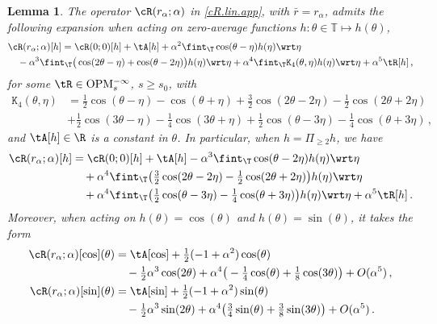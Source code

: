 \documentclass[a4paper,reqno,10pt]{article}
\newtheorem{lem}{Lemma}[section]
\newcommand{\OpM}{{\rm O}{\rm P}{\rm M}}
\begin{document}
\begin{lem}\label{lemma.R.expand}
The operator $\cR(r_\alpha;\alpha)$ in \eqref{cR.lin.app}, with $\bar r = r_\alpha$, admits the following expansion when acting on zero-average functions $h:\theta\in\mathbb{T}\mapsto h(\theta)$, 	
    \begin{align}
			&\cR(r_\alpha;\alpha) [h]  = \cR(0;0)[h] +	\tA[h]+ {\alpha^2}\fint_{\T}\cos(\theta-\eta) h(\eta) \wrt \eta \\
			&\quad  - {\alpha^3} \fint_{\T}\big( \cos(2\theta-\eta) + \cos(\theta-2\eta) \big)h(\eta) \wrt \eta +{\alpha^4}\fint_{\T} \mathtt{K}_4(\theta,\eta)h(\eta) \wrt\eta  +\alpha^5 \tR[h]\,,
			\label{exp.R.total}
	\end{align}
  for some $\tR \in \OpM_{s}^{-\infty}$, $s\geq s_0$,  with
    \begin{align}
        \mathtt{K}_4(\theta,\eta)&= \tfrac12 \cos(\theta-\eta) - \cos(\theta+\eta)+\tfrac32\cos(2\theta-2\eta)  -\tfrac12\cos(2\theta+2\eta)\\
        &+\tfrac12\cos(3\theta-\eta) -\tfrac14\cos(3\theta+\eta)  +\tfrac12 \cos(\theta-3\eta)-\tfrac14\cos(\theta+3\eta) \,, \label{K4.kernel}
    \end{align}
and    $\tA[h]\in \R$ is a constant in $\theta$. 
	In particular, when $h= \Pi_{\geq 2}h$, we have
			\begin{align}
			\cR(r_\alpha;\alpha) [h] & = \cR(0;0)  [h] +	\tA[ h]  - {\alpha^3} \fint_{\T} \cos(\theta-2\eta)h(\eta) \wrt \eta    \\
			&\quad +{\alpha^4}\fint_{\T}\big(\tfrac32\cos(2\theta-2\eta)  -\tfrac12\cos(2\theta+2\eta)\big)  h(\eta) \wrt\eta \\
			&  \quad +{\alpha^4} \fint_{\T} \big(\tfrac12 \cos(\theta-3\eta)-\tfrac14\cos(\theta+3\eta) \big)  h(\eta) \wrt\eta +\alpha^5 \tR[h] \,.
			\label{exp.R.geq2}
			\end{align}
	Moreover, when acting on $h(\theta)=\cos(\theta)$ and $h(\theta)=\sin(\theta)$, it takes the form
		\begin{align}
			\cR(r_\alpha;\alpha) [\cos](\theta) & = \tA[\cos] + {\tfrac12(-1+\alpha^2)\cos(\theta)} \\
			&\quad - \tfrac12\alpha^3 \cos(2\theta)+ \alpha^4\big( -\tfrac14 \cos(\theta) +\tfrac18 \cos(3\theta) \big) + O(\alpha^5) \,, \label{exp.R.modecos}  \\
				\cR(r_\alpha;\alpha) [\sin](\theta) & = \tA[\sin] +{ \tfrac12(-1+\alpha^2)\sin(\theta)} \\
				& \quad - \tfrac12\alpha^3\sin(2\theta)+\alpha^4\big( \tfrac34\sin(\theta) +\tfrac38 \sin(3\theta)\big) + O(\alpha^5) \,. \label{exp.R.modesin}
		\end{align}
\end{lem}
\end{document}

